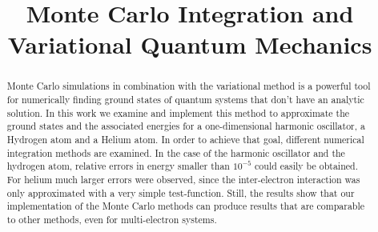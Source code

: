 \documentclass[conference]{IEEEtran}
\begin{document}
\title{Monte Carlo Integration and Variational Quantum Mechanics}


\author{
\and
{}
\and
{}
}


\maketitle


\begin{abstract}

Monte Carlo simulations in combination with the variational method is a powerful tool for numerically finding ground states of quantum systems that don't have an analytic solution. In this work we examine and implement this method to approximate the ground states and the associated energies for a one-dimensional harmonic oscillator, a Hydrogen atom and a Helium atom. In order to achieve that goal, different numerical integration methods are examined. In the case of the harmonic oscillator and the hydrogen atom, relative errors in energy smaller than $10^{-5}$ could easily be obtained. For helium much larger errors were observed, since the inter-electron interaction was only approximated with a very simple test-function. Still, the results show that our implementation of the Monte Carlo methods can produce results that are comparable to other methods, even for multi-electron systems.


\end{abstract}

\IEEEpeerreviewmaketitle














\end{document}
